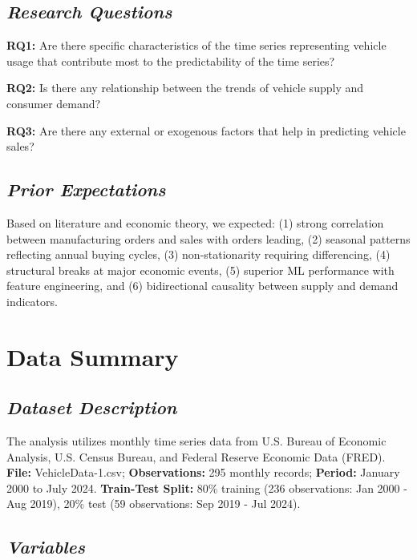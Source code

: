 \documentclass[12pt]{article}
\begin{document}
\subsection*{\textit{Research Questions}}

\textbf{RQ1:} Are there specific characteristics of the time series representing vehicle usage that contribute most to the predictability of the time series?

\textbf{RQ2:} Is there any relationship between the trends of vehicle supply and consumer demand?

\textbf{RQ3:} Are there any external or exogenous factors that help in predicting vehicle sales?

\subsection*{\textit{Prior Expectations}}

Based on literature and economic theory, we expected: (1) strong correlation between manufacturing orders and sales with orders leading, (2) seasonal patterns reflecting annual buying cycles, (3) non-stationarity requiring differencing, (4) structural breaks at major economic events, (5) superior ML performance with feature engineering, and (6) bidirectional causality between supply and demand indicators.

\section*{\textbf{Data Summary}}

\subsection*{\textit{Dataset Description}}

The analysis utilizes monthly time series data from U.S. Bureau of Economic Analysis, U.S. Census Bureau, and Federal Reserve Economic Data (FRED). \textbf{File:} VehicleData-1.csv; \textbf{Observations:} 295 monthly records; \textbf{Period:} January 2000 to July 2024. \textbf{Train-Test Split:} 80\% training (236 observations: Jan 2000 - Aug 2019), 20\% test (59 observations: Sep 2019 - Jul 2024).

\subsection*{\textit{Variables}}
\end{document}
